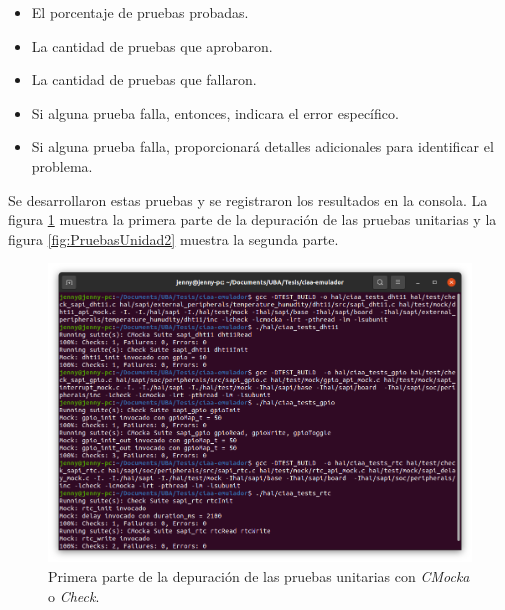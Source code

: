 \begin{itemize}
	\item El porcentaje de pruebas probadas.
	\item La cantidad de pruebas que aprobaron.
	\item La cantidad de pruebas que fallaron.
	\item Si alguna prueba falla, entonces, indicara el error específico.
	\item Si alguna prueba falla, proporcionará detalles adicionales para identificar el problema.
\end{itemize}

Se desarrollaron estas pruebas y se registraron los resultados en la consola. La figura \ref{fig:PruebasUnidad1} muestra la primera parte de la depuración de las pruebas unitarias y la figura \ref{fig:PruebasUnidad2} muestra la segunda parte.
\hfill \break
\hfill \break
\hfill \break
\begin{figure}[ht]
	\centering
	\includegraphics[scale=.27]{./Figures/PruebasUnidad1.png}
	\caption{Primera parte de la depuración de las pruebas unitarias con \textit{CMocka} o \textit{Check}.}
	\label{fig:PruebasUnidad1}
\end{figure}


